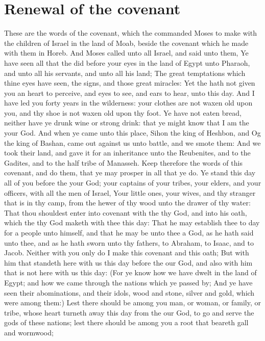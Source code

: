 \section*{Renewal of the covenant}
\begin{biblechapter} %
\verse These are the words of the covenant, which the \LORD commanded Moses to make with the children of Israel in the land of Moab, beside the covenant which he made with them in Horeb.
\verse And Moses called unto all Israel, and said unto them, Ye have seen all that the \LORD did before your eyes in the land of Egypt unto Pharaoh, and unto all his servants, and unto all his land;
\verse The great temptations which thine eyes have seen, the signs, and those great miracles:
\verse Yet the \LORD hath not given you an heart to perceive, and eyes to see, and ears to hear, unto this day.
\verse And I have led you forty years in the wilderness: your clothes are not waxen old upon you, and thy shoe is not waxen old upon thy foot.
\verse Ye have not eaten bread, neither have ye drunk wine or strong drink: that ye might know that I am the \LORD your God.
\verse And when ye came unto this place, Sihon the king of Heshbon, and Og the king of Bashan, came out against us unto battle, and we smote them:
\verse And we took their land, and gave it for an inheritance unto the Reubenites, and to the Gadites, and to the half tribe of Manasseh.
\verse Keep therefore the words of this covenant, and do them, that ye may prosper in all that ye do.
\verse Ye stand this day all of you before the \LORD your God; your captains of your tribes, your elders, and your officers, with all the men of Israel,
\verse Your little ones, your wives, and thy stranger that is in thy camp, from the hewer of thy wood unto the drawer of thy water:
\verse That thou shouldest enter into covenant with the \LORD thy God, and into his oath, which the \LORD thy God maketh with thee this day:
\verse That he may establish thee to day for a people unto himself, and that he may be unto thee a God, as he hath said unto thee, and as he hath sworn unto thy fathers, to Abraham, to Isaac, and to Jacob.
\verse Neither with you only do I make this covenant and this oath;
\verse But with him that standeth here with us this day before the \LORD our God, and also with him that is not here with us this day:
\verse (For ye know how we have dwelt in the land of Egypt; and how we came through the nations which ye passed by;
\verse And ye have seen their abominations, and their idols, wood and stone, silver and gold, which were among them:)
\verse Lest there should be among you man, or woman, or family, or tribe, whose heart turneth away this day from the \LORD our God, to go and serve the gods of these nations; lest there should be among you a root that beareth gall and wormwood;

\end{biblechapter}
